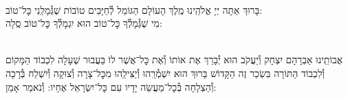 \documentclass[twoside, openany, parskip=half, 11pt]{book}
\begin{document}
\newcommand{\hagomel}{
\begin{sometimes}

\instruction{ברכת הגומל:}\\
בָּרוּךְ אַתָּה יְיָ אֱלֹהֵֽינוּ מֶֽלֶךְ הָעוֹלָם הַגּוֹמֵל לְ֯חַיָּבִים טוֹבוֹת שֶׁגְּ֯מָלַֽנִי כׇּל־טוֹב:\\
\kahal
מִי שֶׁגְּ֯מָלְ֯ךָ כׇּל־טוֹב הוּא יִגְמָלְ֯ךָ כׇּל־טוֹב סֶֽלָה:

\end{sometimes}}

\pesicha

\gadlu

\avharachamim

\vesigale


\torahbarachu

\hagomel

\vspace{-\baselineskip}

\\
אֲבוֹתֵֽינוּ אַבְרָהָם יִצְחָק וְ֯יַעֲקֹב הוּא יְ֯בָרֵךְ אֶת
אוֹתוֹ וְ֯אֶת כׇּל־אֲשֶׁר לוֹ
בַּעֲבוּר שֶׁעָלָה לִכְבוֹד הַמָּקוֹם וְ֯לִכְבוֹד הַתּוֹרָה
בִּשְׂכַר זֶה הַקָּדוֹשׁ בָּרוּךְ הוּא יִשְׁמְ֯רֵֽהוּ וְ֯יַצִּילֵֽהוּ מִכׇּל־צָרָה וְ֯צוּקָה
וְ֯יִשְׁלַח בְּ֯רָכָה וְ֯הַצְלָחָה בְּ֯כׇל־מַעֲשֵׂה יָדָיו עִם כׇּל־יִשְׂרָאֵל אֶחָיו: וְ֯נֹאמַר אָמֵן:
\end{document}
